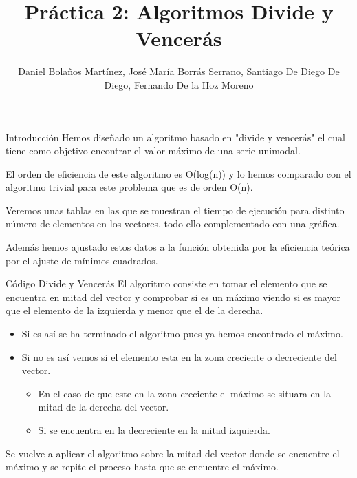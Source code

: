 \documentclass[12pt]{beamer}
\author{Daniel Bolaños Martínez, José María Borrás Serrano, Santiago De Diego De Diego, Fernando De la Hoz Moreno}
\title{Práctica 2: Algoritmos Divide y Vencerás}
\institute{ETSIIT}
\date{}
\begin{document}
\begin{frame}
\titlepage
\end{frame}


\begin{frame}{Introducción}
Hemos diseñado un algoritmo basado en "divide y vencerás" el cual tiene como objetivo encontrar el valor máximo de una serie unimodal. 

\vspace{5mm} %

El orden de eficiencia de este algoritmo es O(log(n)) y lo hemos comparado con el algoritmo trivial para este problema que es de orden O(n).
\end{frame}
\begin{frame}
Veremos unas tablas en las que se muestran el tiempo de ejecución para distinto número de elementos en los vectores, todo ello complementado con una gráfica.

\vspace{5mm} %

Además hemos ajustado estos datos a la función obtenida por la eficiencia teórica por el ajuste de mínimos cuadrados.
\end{frame}

\begin{frame}{Código Divide y Vencerás}
El algoritmo consiste en tomar el elemento que se encuentra en mitad del vector y comprobar si es un máximo viendo si es mayor que el elemento de la izquierda y menor que el de la derecha. 

\vspace{2mm} %

\begin{itemize}
\item Si es así se ha terminado el algoritmo pues ya hemos encontrado el máximo. 
\item Si no es así vemos si el elemento esta en la zona creciente o decreciente del vector.
	\begin{itemize}
	\item En el caso de que este en la zona creciente el máximo se situara en la mitad de la derecha del vector.
	\item Si se encuentra en la decreciente en la mitad izquierda.
	\end{itemize}
\end{itemize}
Se vuelve a aplicar el algoritmo sobre la mitad del vector donde se encuentre el máximo y se repite el proceso hasta que se encuentre el máximo.
\end{frame}
\end{document}

